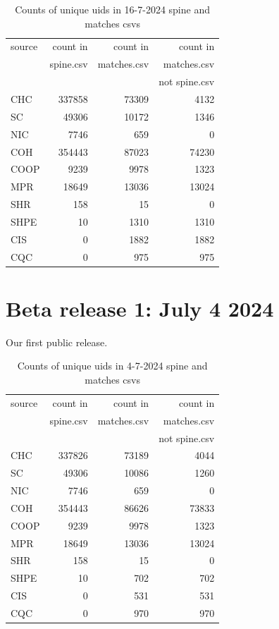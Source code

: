 \documentclass{article}
\begin{document}
\begin{table}[h]
    \centering
    \begin{tabularx}{0.6\textwidth}{|X|r|r|r|}
    \hline
    source & count in & count in & count in \\
    & spine.csv &  matches.csv &  matches.csv \\
    &&& not spine.csv \\
    \hline
    CHC & 337858 & 73309 & 4132 \\
    SC & 49306 & 10172 & 1346 \\
    NIC & 7746 & 659 & 0 \\
    COH & 354443 & 87023 & 74230 \\
    COOP & 9239 & 9978 & 1323 \\
    MPR & 18649 & 13036 & 13024 \\
    SHR & 158 & 15 & 0 \\
    SHPE & 10 & 1310 & 1310 \\
    CIS & 0 & 1882 & 1882 \\
    CQC & 0 & 975 & 975 \\
    \hline
\end{tabularx}
\caption{Counts of unique uids in 16-7-2024 spine and matches csvs}
\end{table}

    
\section{Beta release 1: July 4 2024}

Our first public release. 

\begin{table}[h]
    \centering
    \begin{tabularx}{0.6\textwidth}{|X|r|r|r|}
    \hline
    source & count in & count in & count in \\
    & spine.csv &  matches.csv &  matches.csv \\
    &&& not spine.csv \\
    \hline
    CHC & 337826 & 73189 & 4044 \\
SC & 49306 & 10086 & 1260 \\
NIC & 7746 & 659 & 0 \\
COH & 354443 & 86626 & 73833 \\
COOP & 9239 & 9978 & 1323 \\
MPR & 18649 & 13036 & 13024 \\
SHR & 158 & 15 & 0 \\
SHPE & 10 & 702 & 702 \\
CIS & 0 & 531 & 531 \\
CQC & 0 & 970 & 970 \\
\hline
    \end{tabularx}
\caption{Counts of unique uids in 4-7-2024 spine and matches csvs}
\end{table}
%
\end{document}
